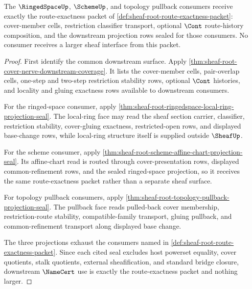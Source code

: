 \begin{theorem}
\label{thm:sheaf-root-route-exactness-namecert-consumption}
The $\RingedSpaceUp$, $\SchemeUp$, and topology pullback consumers receive exactly the route-exactness packet of \autoref{def:sheaf-root-route-exactness-packet}: cover-member cells, restriction classifier transport, optional $\Cont$ route-history composition, and the downstream projection rows sealed for those consumers. No consumer receives a larger sheaf interface from this packet.
\end{theorem}
\begin{proof}
First identify the common downstream surface. Apply \autoref{thm:sheaf-root-cover-nerve-downstream-coverage}. It lists the cover-member cells, pair-overlap cells, one-step and two-step restriction stability rows, optional $\Cont$ histories, and locality and gluing exactness rows available to downstream consumers.

For the ringed-space consumer, apply \autoref{thm:sheaf-root-ringedspace-local-ring-projection-seal}. The local-ring face may read the sheaf section carrier, classifier, restriction stability, cover-gluing exactness, restricted-open rows, and displayed base-change rows, while local-ring structure itself is supplied outside $\SheafUp$.

For the scheme consumer, apply \autoref{thm:sheaf-root-scheme-affine-chart-projection-seal}. Its affine-chart read is routed through cover-presentation rows, displayed common-refinement rows, and the sealed ringed-space projection, so it receives the same route-exactness packet rather than a separate sheaf surface.

For topology pullback consumers, apply \autoref{thm:sheaf-root-topology-pullback-projection-seal}. The pullback face reads pulled-back cover membership, restriction-route stability, compatible-family transport, gluing pullback, and common-refinement transport along displayed base change.

The three projections exhaust the consumers named in \autoref{def:sheaf-root-route-exactness-packet}. Since each cited seal excludes host powerset equality, cover quotients, stalk quotients, external sheafification, and standard bridge closure, downstream $\NameCert$ use is exactly the route-exactness packet and nothing larger.
\end{proof}
